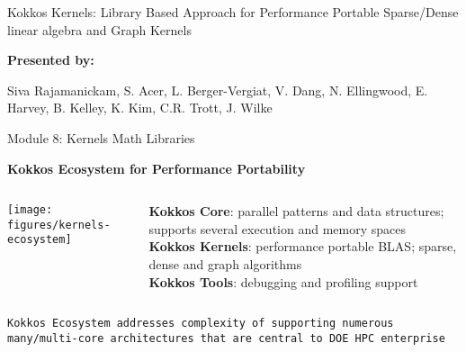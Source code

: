 \begin{frame}[fragile]

  {\Huge Kokkos Kernels: Library Based Approach for Performance Portable Sparse/Dense linear algebra and Graph Kernels}

  \vspace{20pt}

  \textbf{Presented by:}

  Siva Rajamanickam, S. Acer, L. Berger-Vergiat, V. Dang, N. Ellingwood, E.
  Harvey, B. Kelley, K. Kim, C.R. Trott, J. Wilke

  \vspace{-20pt}

\end{frame}


\begin{frame}[fragile]{Module 8: Kernels Math Libraries}

\textbf{Kokkos Ecosystem for Performance Portability}

  \begin{columns}[t,onlytextwidth]
    \begin{center}
      \texttt{[image: figures/kernels-ecosystem]}
    \end{center}


    \scriptsize{\textbf{Kokkos Core}: parallel patterns and data structures; supports several execution and memory spaces}
\\
    \scriptsize{\textbf{Kokkos Kernels}: performance portable BLAS; sparse, dense and graph algorithms}
\\
    \scriptsize{\textbf{Kokkos Tools}: debugging and profiling support}


  \end{columns}

  \begin{lstlisting}[frame=single, backgroundcolor=\color{blue!10}, basicstyle=\tiny, breaklines=true, boxpos=c]
    Kokkos Ecosystem addresses complexity of supporting numerous many/multi-core architectures that are central to DOE HPC enterprise
  \end{lstlisting}

\end{frame}

